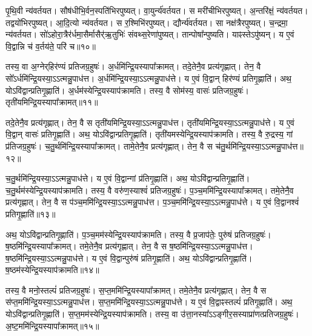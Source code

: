 पृ॒थि॒वी न्य॑वर्तयत।
सौष॑धीभि॒र्वन॒स्पति॑भिरपुष्यत्।
वा॒युर्न्य॑\-वर्तयत।
स मरी॑चीभिरपुष्यत्।
अ॒न्तरि॑क्षं॒ न्य॑वर्तयत।
तद्वयो॑भिर\-पुष्यत्।
आ॒दि॒त्यो न्य॑वर्तयत।
स र॒श्मिभि॑रपुष्यत्।
द्यौर्न्य॑\-वर्तयत।
सा नक्ष॑त्रैरपुष्यत्।
च॒न्द्रमा॒ न्य॑वर्तयत।
सो॑ऽहोरा॒त्रैर॑र्ध\-मा॒सैर्मासैर्॑ऋ॒तुभिः॑ संवथ्स॒रेणा॑पुष्यत्।
तान्पोषा᳚न्पुष्यति।
याꣴस्ते\-ऽपु॑ष्यन्।
य ए॒वं वि॒द्वान्नि च॑ व॒र्तय॑ते॒ परि॑ च॥१०॥\anuvakamend[अ॒पु॒ष्य॒न्नक्ष॑त्रैरपुष्य॒त्पञ्च॑ च]

तस्य॒ वा अ॒ग्नेर्‌\mbox{}हिर॑ण्यं प्रतिजग्र॒हुषः॑।
अ॒र्धमि॑न्द्रि॒य\-स्यापा᳚\-क्रामत्।
तदे॒तेनै॒व प्रत्य॑गृह्णात्।
तेन॒ वै सो᳚\-ऽर्धमि॑न्द्रि॒य\-स्या॒\-ऽऽत्मन्नु॒पा\-ध॑त्त।
अ॒र्धमि॑न्द्रि॒य\-स्या॒\-ऽऽत्मन्नु॒पा\-ध॑त्ते।
य ए॒वं वि॒द्वान् हिर॑ण्यं प्रतिगृ॒ह्णाति॑।
अथ॒ योऽवि॑द्वान्प्रति\-गृ॒ह्णाति॑।
अ॒र्धम॑स्येन्द्रि॒य\-स्याप॑\-क्रामति।
तस्य॒ वै सोम॑स्य॒ वासः॑ प्रतिजग्र॒हुषः॑।
तृती॑यमिन्द्रि॒य\-स्यापा᳚क्रामत्॥११॥

तदे॒तेनै॒व प्रत्य॑गृह्णात्।
तेन॒ वै स तृती॑यमिन्द्रि॒य\-स्या॒\-ऽऽत्मन्नु॒पा\-ध॑त्त।
तृती॑यमिन्द्रि॒य\-स्या॒\-ऽऽत्मन्नु॒पा\-ध॑त्ते।
य ए॒वं वि॒द्वान् वासः॑ प्रतिगृ॒ह्णाति॑।
अथ॒ योऽवि॑द्वान्प्रति\-गृ॒ह्णाति॑।
तृती॑यमस्येन्द्रि॒य\-स्याप॑\-क्रामति।
तस्य॒ वै रु॒द्रस्य॒ गां प्र॑तिजग्र॒हुषः॑।
च॒तु॒र्थमि॑न्द्रि॒य\-स्यापा᳚\-क्रामत्।
तामे॒तेनै॒व प्रत्य॑गृह्णात्।
तेन॒ वै स च॑तु॒र्थमि॑न्द्रि॒य\-स्या॒\-ऽऽत्मन्नु॒पा\-ध॑त्त॥१२॥

च॒तु॒र्थमि॑न्द्रि॒य\-स्या॒\-ऽऽत्मन्नु॒पा\-ध॑त्ते।
य ए॒वं वि॒द्वान्गां प्र॑तिगृ॒ह्णाति॑।
अथ॒ योऽवि॑द्वान्प्रतिगृ॒ह्णाति॑।
च॒तु॒र्थम॑स्येन्द्रि॒य\-स्याप॑\-क्रामति।
तस्य॒ वै वरु॑ण॒स्याश्वं॑ प्रतिजग्र॒हुषः॑।
प॒ञ्च॒ममि॑\-न्द्रि॒य\-स्यापा᳚\-क्रामत्।
तमे॒तेनै॒व प्रत्य॑गृह्णात्।
तेन॒ वै स प॑ञ्च॒ममि॑न्द्रि॒य\-स्या॒\-ऽऽत्मन्नु॒पा\-ध॑त्त।
प॒ञ्च॒ममि॑\-न्द्रि॒य\-स्या॒\-ऽऽत्मन्नु॒पा\-ध॑त्ते।
य ए॒वं वि॒द्वानश्वं॑ प्रति\-गृ॒ह्णाति॑॥१३॥

अथ॒ योऽवि॑द्वान्प्रतिगृ॒ह्णाति॑।
प॒ञ्च॒मम॑स्येन्द्रि॒य\-स्याप॑\-क्रामति।
तस्य॒ वै प्र॒जा\-प॑तेः॒ पुरु॑षं प्रति\-जग्र॒हुषः॑।
ष॒ष्ठमि॑न्द्रि॒य\-स्यापा᳚क्रामत्।
तमे॒तेनै॒व प्रत्य॑गृह्णात्।
तेन॒ वै स ष॒ष्ठमि॑न्द्रि॒य\-स्या॒\-ऽऽत्मन्नु॒पा\-ध॑त्त।
ष॒ष्ठमि॑न्द्रि॒य\-स्या॒\-ऽऽत्मन्नु॒पा\-ध॑त्ते।
य ए॒वं वि॒द्वान्पुरु॑षं प्रति\-गृ॒ह्णाति॑।
अथ॒ योऽवि॑द्वान्प्रति\-गृ॒ह्णाति॑।
ष॒ष्ठम॑स्येन्द्रि॒य\-स्याप॑\-क्रामति॥१४॥

तस्य॒ वै मनो॒स्तल्पं॑ प्रति\-जग्र॒हुषः॑।
स॒प्त॒ममि॑न्द्रि॒य\-स्यापा᳚\-क्रामत्।
तमे॒तेनै॒व प्रत्य॑\-गृह्णात्।
तेन॒ वै स स॑प्त॒ममि॑न्द्रि॒य\-स्या॒\-ऽऽत्मन्नु॒पा\-ध॑त्त।
स॒प्त॒ममि॑न्द्रि॒य\-स्या॒\-ऽऽत्मन्नु॒पा\-ध॑त्ते।
य ए॒वं वि॒द्वाꣴस्तल्पं॑ प्रति\-गृ॒ह्णाति॑।
अथ॒ यो\-ऽवि॑द्वान्प्रति\-गृ॒ह्णाति॑।
स॒प्त॒मम॑स्येन्द्रि॒य\-स्याप॑\-क्रामति।
तस्य॒ वा उ॑त्ता॒नस्या᳚\-ऽऽङ्गीर॒सस्याप्रा॑णत्प्रति\-जग्र॒हुषः॑।
अ॒ष्ट॒ममि॑न्द्रि॒य\-स्यापा᳚क्रामत्॥१५॥


